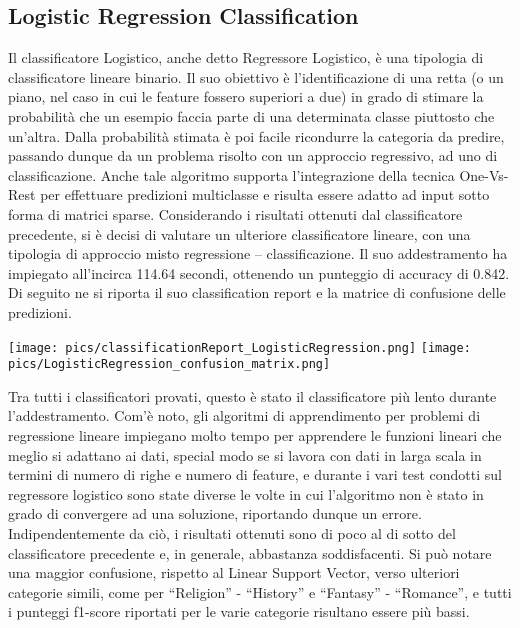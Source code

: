 \documentclass[12pt,oneside]{article}
\begin{document}
    \begin{enumerate}
    
    \subsection{Logistic Regression Classification}
    \begin{justify}
    Il classificatore Logistico, anche detto Regressore Logistico, è una tipologia di classificatore lineare binario. Il suo obiettivo è l’identificazione di una retta (o un piano, nel caso in cui le feature fossero superiori a due) in grado di stimare la probabilità che un esempio faccia parte di una determinata classe piuttosto che un’altra. Dalla probabilità stimata è poi facile ricondurre la categoria da predire, passando dunque da un problema risolto con un approccio regressivo, ad uno di classificazione. 
    Anche tale algoritmo supporta l’integrazione della tecnica One-Vs-Rest per effettuare predizioni multiclasse e risulta essere adatto ad input sotto forma di matrici sparse. Considerando i risultati ottenuti dal classificatore precedente, si è decisi di valutare un ulteriore classificatore lineare, con una tipologia di approccio misto regressione – classificazione.
    Il suo addestramento ha impiegato all’incirca 114.64 secondi, ottenendo un punteggio di accuracy di 0.842. Di seguito ne si riporta il suo classification report e la matrice di confusione delle predizioni.
    \end{justify}

    \texttt{[image: pics/classificationReport\_LogisticRegression.png]}
    \texttt{[image: pics/LogisticRegression\_confusion\_matrix.png]}

    \begin{justify}
    Tra tutti i classificatori provati, questo è stato il classificatore più lento durante l’addestramento. Com’è noto, gli algoritmi di apprendimento per problemi di regressione lineare impiegano molto tempo per apprendere le funzioni lineari che meglio si adattano ai dati, special modo se si lavora con dati in larga scala in termini di numero di righe e numero di feature, e durante i vari test condotti sul regressore logistico sono state diverse le volte in cui l’algoritmo non è stato in grado di convergere ad una soluzione, riportando dunque un errore. Indipendentemente da ciò, i risultati ottenuti sono di poco al di sotto del classificatore precedente e, in generale, abbastanza soddisfacenti. Si può notare una maggior confusione, rispetto al Linear Support Vector, verso ulteriori categorie simili, come per “Religion” - “History” e “Fantasy” - “Romance”, e tutti i punteggi f1-score riportati per le varie categorie risultano essere più bassi. 
    \end{justify}
    \end{enumerate}
\end{document}
